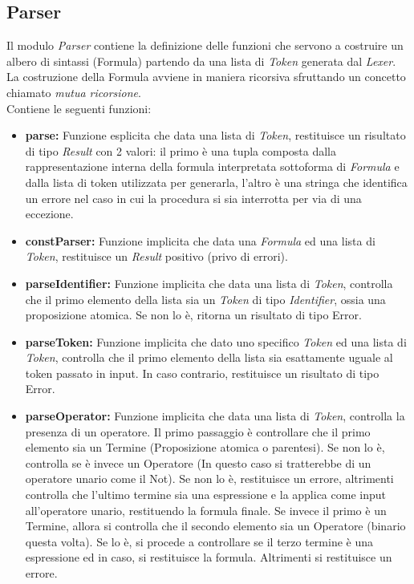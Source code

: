 \documentclass[\main/tesi.tex]{subfiles}
\begin{document}
\subsection{Parser}
Il modulo \textit{Parser} contiene la definizione delle funzioni che servono a costruire un albero di sintassi (Formula) partendo da una lista di \textit{Token} generata dal \textit{Lexer}. La costruzione della Formula avviene in maniera ricorsiva sfruttando un concetto chiamato \textit{mutua ricorsione}. \\
Contiene le seguenti funzioni:
\begin{itemize}
    \item \textbf{parse:} Funzione esplicita che data una lista di \textit{Token}, restituisce un risultato di tipo \textit{Result} con 2 valori: il primo è una tupla composta dalla rappresentazione interna della formula interpretata sottoforma di \textit{Formula} e dalla lista di token utilizzata per generarla, l'altro è una stringa che identifica un errore nel caso in cui la procedura si sia interrotta per via di una eccezione.
    \item \textbf{constParser:} Funzione implicita che data una \textit{Formula} ed una lista di \textit{Token}, restituisce un \textit{Result} positivo (privo di errori).
    \item \textbf{parseIdentifier:} Funzione implicita che data una lista di \textit{Token}, controlla che il primo elemento della lista sia un \textit{Token} di tipo \textit{Identifier}, ossia una proposizione atomica. Se non lo è, ritorna un risultato di tipo Error.
    \item \textbf{parseToken:} Funzione implicita che dato uno specifico \textit{Token} ed una lista di \textit{Token}, controlla che il primo elemento della lista sia esattamente uguale al token passato in input. In caso contrario, restituisce un risultato di tipo Error.
    \item \textbf{parseOperator:} Funzione implicita che data una lista di \textit{Token}, controlla la presenza di un operatore. Il primo passaggio è controllare che il primo elemento sia un Termine (Proposizione atomica o parentesi). Se non lo è, controlla se è invece un Operatore (In questo caso si tratterebbe di un operatore unario come il Not). Se non lo è, restituisce un errore, altrimenti controlla che l'ultimo termine sia una espressione e la applica come input all'operatore unario, restituendo la formula finale. Se invece il primo è un Termine, allora si controlla che il secondo elemento sia un Operatore (binario questa volta). Se lo è, si procede a controllare se il terzo termine è una espressione ed in caso, si restituisce la formula. Altrimenti si restituisce un errore.

\end{itemize}
\end{document}
